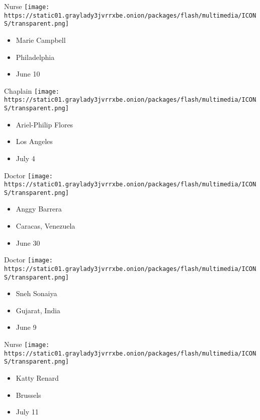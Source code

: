 \protect\hyperlink{item-marie-campbell}{}

Nurse
\texttt{[image: https://static01.graylady3jvrrxbe.onion/packages/flash/multimedia/ICONS/transparent.png]}

\begin{itemize}
\tightlist
\item
  Marie Campbell
\item
  Philadelphia
\item
  June 10
\end{itemize}

\protect\hyperlink{item-ariel-philip-flores}{}

Chaplain
\texttt{[image: https://static01.graylady3jvrrxbe.onion/packages/flash/multimedia/ICONS/transparent.png]}

\begin{itemize}
\tightlist
\item
  Ariel-Philip Flores
\item
  Los Angeles
\item
  July 4
\end{itemize}

\protect\hyperlink{item-anggy-barrera}{}

Doctor
\texttt{[image: https://static01.graylady3jvrrxbe.onion/packages/flash/multimedia/ICONS/transparent.png]}

\begin{itemize}
\tightlist
\item
  Anggy Barrera
\item
  Caracas, Venezuela
\item
  June 30
\end{itemize}

\protect\hyperlink{item-sneh-sonaiya}{}

Doctor
\texttt{[image: https://static01.graylady3jvrrxbe.onion/packages/flash/multimedia/ICONS/transparent.png]}

\begin{itemize}
\tightlist
\item
  Sneh Sonaiya
\item
  Gujarat, India
\item
  June 9
\end{itemize}

\protect\hyperlink{item-katty-renard}{}

Nurse
\texttt{[image: https://static01.graylady3jvrrxbe.onion/packages/flash/multimedia/ICONS/transparent.png]}

\begin{itemize}
\tightlist
\item
  Katty Renard
\item
  Brussels
\item
  July 11
\end{itemize}

